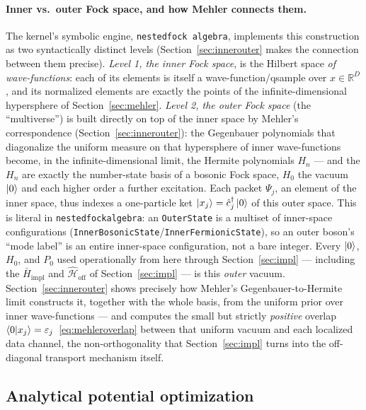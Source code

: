 \documentclass[11pt, a4paper]{article}
\newcommand{\Hgen}{\hat{\mathcal{H}}}
\newcommand{\Rset}{\mathbb{R}}
\begin{document}
\paragraph{Inner vs.\ outer Fock space, and how Mehler connects them.} The
kernel's symbolic engine, \texttt{nested\textunderscore fock\textunderscore
algebra}, implements this construction as two syntactically distinct levels
(Section~\ref{sec:innerouter} makes the connection between them precise).
\emph{Level 1, the inner Fock space}, is the Hilbert space \emph{of
wave-functions}: each of its elements is itself a wave-function/qsample over
$x\in\Rset^D$, and its normalized elements are exactly the points of the
infinite-dimensional hypersphere of Section~\ref{sec:mehler}. \emph{Level 2,
the outer Fock space} (the ``multiverse'') is built directly on top of the
inner space by Mehler's correspondence (Section~\ref{sec:innerouter}): the
Gegenbauer polynomials that diagonalize the uniform measure on that
hypersphere of inner wave-functions become, in the infinite-dimensional
limit, the Hermite polynomials $H_n$ --- and the $H_n$ are exactly the
number-state basis of a bosonic Fock space, $H_0$ the vacuum $\ket{0}$ and
each higher order a further excitation. Each packet $\Psi_j$, an element of
the inner space, thus indexes a one-particle ket
$\ket{x_j}=\hat c_j^\dagger\ket{0}$ of this outer space. This is literal in
\texttt{nested\textunderscore fock\textunderscore algebra}: an
\texttt{OuterState} is a multiset of inner-space configurations
(\texttt{InnerBosonicState}/\texttt{InnerFermionicState}), so an outer boson's
``mode label'' is an entire inner-space configuration, not a bare integer.
Every $\ket{0}$, $H_0$, and $P_0$ used operationally from here through
Section~\ref{sec:impl} --- including the $\bar H_{\text{impl}}$ and
$\Hgen_{\text{off}}$ of Section~\ref{sec:impl} --- is this \emph{outer}
vacuum. Section~\ref{sec:innerouter} shows precisely how Mehler's
Gegenbauer-to-Hermite limit constructs it, together with the whole basis,
from the uniform prior over inner wave-functions --- and computes the small
but strictly \emph{positive} overlap
$\braket{0|x_j}=\varepsilon_j$~\eqref{eq:mehleroverlap} between that
uniform vacuum and each localized data channel, the non-orthogonality that
Section~\ref{sec:impl} turns into the off-diagonal transport mechanism
itself.

\subsection{Analytical potential optimization}
\end{document}

